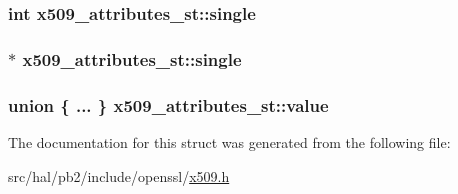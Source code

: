 \subsubsection[{\texorpdfstring{single}{single}}]{\setlength{\rightskip}{0pt plus 5cm}int x509\+\_\+attributes\+\_\+st\+::single}\hypertarget{structx509__attributes__st_a04dd95e9253f6b16f682e70eb5eec2ca}{}\label{structx509__attributes__st_a04dd95e9253f6b16f682e70eb5eec2ca}
\subsubsection[{\texorpdfstring{single}{single}}]{$\ast$ x509\+\_\+attributes\+\_\+st\+::single}\hypertarget{structx509__attributes__st_a3e24cce99fbb3fcb2c689e33f9943d0b}{}\label{structx509__attributes__st_a3e24cce99fbb3fcb2c689e33f9943d0b}
\subsubsection[{\texorpdfstring{value}{value}}]{\setlength{\rightskip}{0pt plus 5cm}union \{ ... \}   x509\+\_\+attributes\+\_\+st\+::value}\hypertarget{structx509__attributes__st_a331805c6cdab06ff668e8b3b0f5ad61a}{}\label{structx509__attributes__st_a331805c6cdab06ff668e8b3b0f5ad61a}


The documentation for this struct was generated from the following file\+:\begin{DoxyCompactItemize}
\item 
src/hal/pb2/include/openssl/\hyperlink{x509_8h}{x509.\+h}\end{DoxyCompactItemize}
